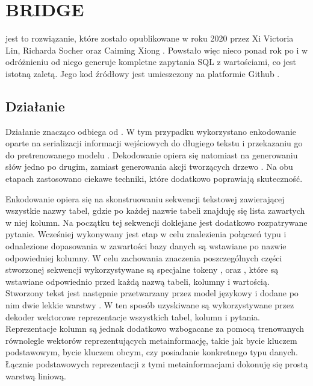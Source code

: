 \section{BRIDGE}
 jest to rozwiązanie, które zostało opublikowane w roku 2020 przez Xi Victoria Lin, Richarda Socher oraz Caiming Xiong \cite{Lin2020}. Powstało więc nieco ponad rok po  i w odróżnieniu od niego generuje kompletne zapytania SQL z wartościami, co jest istotną zaletą. Jego kod źródłowy jest umieszczony na platformie Github \cite{bridge-repository}.

\subsection{Działanie}
Działanie  znacząco odbiega od . W tym przypadku wykorzystano enkodowanie oparte na serializacji informacji wejściowych do długiego tekstu i przekazaniu go do pretrenowanego modelu . Dekodowanie opiera się natomiast na generowaniu słów jedno po drugim, zamiast generowania akcji tworzących drzewo . Na obu etapach zastosowano ciekawe techniki, które dodatkowo poprawiają skuteczność.

Enkodowanie opiera się na skonstruowaniu sekwencji tekstowej zawierającej wszystkie nazwy tabel, gdzie po każdej nazwie tabeli znajduję się lista zawartych w niej kolumn. Na początku tej sekwencji doklejane jest dodatkowo rozpatrywane pytanie. Wcześniej wykonywany jest etap  w celu znalezienia połączeń typu  i odnalezione dopasowania w zawartości bazy danych są  wstawiane po nazwie odpowiedniej kolumny. W celu zachowania znaczenia poszczególnych części stworzonej sekwencji wykorzystywane są specjalne tokeny \code{[T]}, \code{[C]} oraz \code{[V]}, które są wstawiane odpowiednio przed każdą nazwą tabeli, kolumny i wartością. Stworzony tekst jest następnie przetwarzany przez model językowy  i dodane po nim dwie lekkie warstwy . W ten sposób uzyskiwane są wykorzystywane przez dekoder wektorowe reprezentacje wszystkich tabel, kolumn i pytania. Reprezentacje kolumn są jednak dodatkowo wzbogacane za pomocą trenowanych równolegle wektorów reprezentujących metainformację, takie jak bycie kluczem podstawowym, bycie kluczem obcym, czy posiadanie konkretnego typu danych. Łącznie podstawowych reprezentacji z tymi metainformacjami dokonuję się prostą warstwą liniową.

